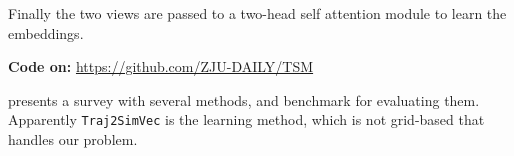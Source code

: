 Finally the two views are passed to a two-head self attention module to learn the embeddings.



\textbf{Code on:} \url{https://github.com/ZJU-DAILY/TSM}

\cite{hu2023spatio} presents a survey with several methods, and benchmark for evaluating them. Apparently \texttt{Traj2SimVec} \cite{zhang2020trajectory} is the learning method, which is not grid-based that handles our problem.